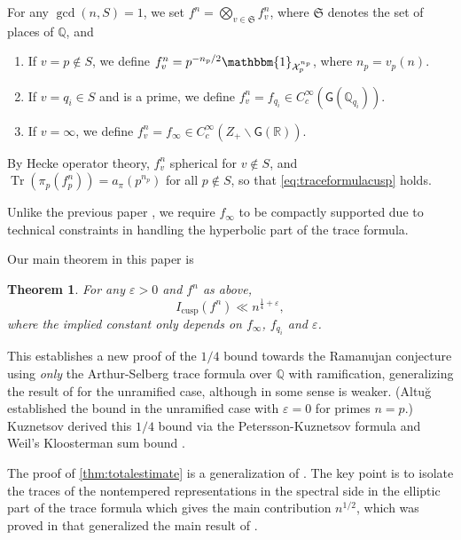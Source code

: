 \documentclass[10pt,oneside,reqno]{amsart}
\newcommand\cX{\mathcal{X}}
\newcommand\QQ{\mathbb{Q}}
\newcommand\RR{\mathbb{R}}
\newcommand\mf[1]{\mathfrak{#1}}
\newcommand\G{\mathsf{G}}
\newcommand\triv{\mathbbm{1}}
\newcommand\bs{\backslash}
\DeclareMathOperator\Tr{Tr}
\theoremstyle{THEOREM}
\newtheorem{theorem}{Theorem}[section]
\theoremstyle{DEFINITION}
\theoremstyle{EXERCISE}
\numberwithin{equation}{section}
\begin{document}
For any $\gcd(n,S)=1$, we set $f^{n}=\bigotimes_{v\in \mf{S}}f^{n}_v$, where $\mf{S}$ denotes the set of places of $\QQ$, and
\begin{enumerate}[itemsep=0pt,parsep=0pt,topsep=2pt,leftmargin=0pt,labelsep=3pt,itemindent=9pt,label=\textbullet]
  \item If $v=p\notin S$, we define $f^n_v=p^{-n_p/2}\triv_{\cX_p^{n_p}}$, where $n_p=v_p(n)$.
  \item If $v=q_i\in S$ and is a prime, we define $f^n_v=f_{q_i}\in C_c^\infty(\G(\QQ_{q_i}))$.
  \item If $v=\infty$, we define $f^n_v=f_\infty\in C_c^\infty(Z_+\bs \G(\RR))$. 
\end{enumerate}
By Hecke operator theory, $f_v^{n}$ spherical for $v\notin S$, and $\Tr(\pi_p(f_p^{n}))=a_{\pi}(p^{n_p})$ for all $p\notin S$, so that \eqref{eq:traceformulacusp} holds.

Unlike the previous paper \cite{cheng2025}, we require $f_\infty$ to be compactly supported due to technical constraints in handling the hyperbolic part of the trace formula.

Our main theorem in this paper is
\begin{theorem}\label{thm:totalestimate}
For any $\varepsilon>0$ and $f^n$ as above,
\[
I_{\mathrm{cusp}}(f^n)\ll n^{\frac 14+\varepsilon},
\]
where the implied constant only depends on $f_\infty$, $f_{q_i}$ and $\varepsilon$.
\end{theorem}

This establishes a new proof of the $1/4$ bound towards the Ramanujan conjecture using \emph{only} the Arthur-Selberg trace formula over 
$\QQ$ with ramification, generalizing the result of \cite{altug2017} for the unramified case, although in some sense is weaker. (Altu\u{g} established the bound in the unramified case with $\varepsilon=0$ for primes $n=p$.) Kuznetsov \cite{kuznetsov1981} derived this $1/4$ bound via the Petersson-Kuznetsov formula and Weil's Kloosterman sum bound \cite{weil1948}.

The proof of \autoref{thm:totalestimate} is a generalization of \cite{altug2017}.
The key point is to isolate the traces of the nontempered representations in the spectral side in the elliptic part of the trace formula which gives the main contribution $n^{1/2}$, which was proved in \cite{cheng2025} that generalized the main result of \cite{altug2015}.
\end{document}

